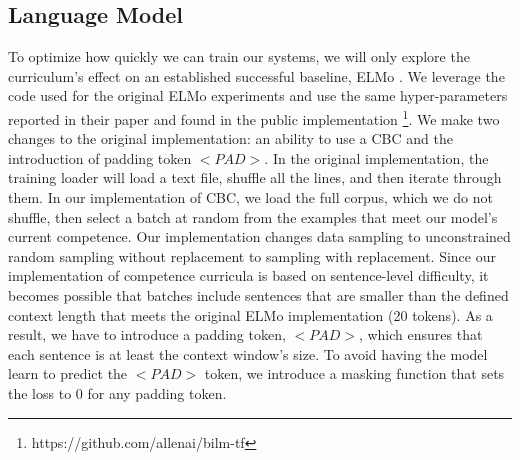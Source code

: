 \subsection{Language Model}
To optimize how quickly we can train our systems, we will only explore the curriculum's effect on an established successful baseline, ELMo \cite{Smith2019ContextualWR}. We leverage the code used for the original ELMo experiments and use the same hyper-parameters reported in their paper and found in the public implementation \footnote{https://github.com/allenai/bilm-tf}. We make two changes to the original implementation: an ability to use a CBC and the introduction of padding token $<PAD>$. In the original implementation, the training loader will load a text file, shuffle all the lines, and then iterate through them. In our implementation of CBC, we load the full corpus, which we do not shuffle, then select a batch at random from the examples that meet our model's current competence. Our implementation changes data sampling to unconstrained random sampling without replacement to sampling with replacement. Since our implementation of competence curricula is based on sentence-level difficulty, it becomes possible that batches include sentences that are smaller than the defined context length that meets the original ELMo implementation (20 tokens). As a result, we have to introduce a padding token, $<PAD>$, which ensures that each sentence is at least the context window's size. To avoid having the model learn to predict the $<PAD>$ token, we introduce a masking function that sets the loss to 0 for any padding token. 
